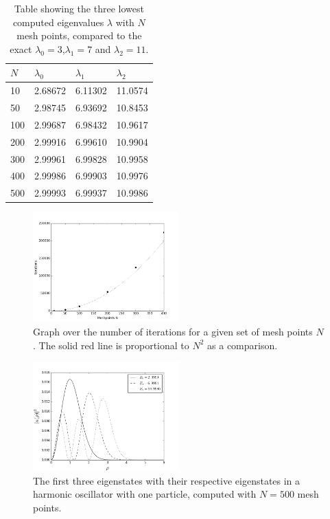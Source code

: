\documentclass[twoside,twocolumn]{article}
\begin{document}
	\begin{table}[h]
		\centering
		\begin{tabular}{|l|l|l|l|}\hline
			$N$ & $\lambda_0$ & $\lambda_1$ & $\lambda_2$\\ \hline
			10 & 2.68672 & 6.11302 & 11.0574\\
			50 & 2.98745 & 6.93692 & 10.8453\\
			100& 2.99687 & 6.98432 & 10.9617\\
			200& 2.99916 & 6.99610 & 10.9904\\
			300& 2.99961 & 6.99828 & 10.9958\\
			400& 2.99986 & 6.99903 & 10.9976\\
			500& 2.99993 & 6.99937 & 10.9986\\\hline
		\end{tabular}
		\caption{Table showing the three lowest computed eigenvalues $\lambda$ with $N$ mesh points, compared to the exact $\lambda_0=3$,$\lambda_1=7$ and $\lambda_2=11$.}\label{tbl:convergence}
	\end{table}
	\begin{figure}[p]
		\includegraphics[width=0.5\textwidth]{figures/iterations.png} 
		\caption{Graph over the number of iterations for a given set of mesh points $N$. The solid red line is proportional to $N^2$ as a comparison.}\label{fig:iterations}
	\end{figure}
	\begin{figure}[p]
		\includegraphics[width=0.5\textwidth]{../report/figures/eigenvecs123.png} 
		\caption{The first three eigenstates with their respective eigenstates in a harmonic oscillator with one particle, computed with $N=500$ mesh points.}\label{fig:eigenstates}
	\end{figure}
\end{document}
